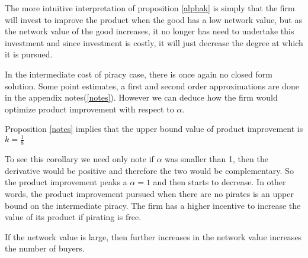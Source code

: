 The more intuitive interpretation of proposition \ref{alphak} is simply that the firm will invest to improve the product when the good has a low network value, but as the network value of the good increases, it no longer has need to undertake this investment and since investment is costly, it will just decrease the degree at which it is pursued.

In the intermediate cost of piracy case, there is once again no closed form solution. Some point estimates, a first and second order approximations are done in the appendix notes(\ref{notes}). However we can deduce how the firm would optimize product improvement with respect to $\alpha$. 

\begin{corollary}
Proposition \ref{notes} implies that the upper bound value of product improvement is $k= \frac{1}{8}$
\end{corollary}


To see this corollary we need only note if $\alpha$ was smaller than 1, then the derivative would be positive and therefore the two would be complementary. So the product improvement peaks a $\alpha=1$ and then starts to decrease. In other words, the product improvement pursued when there are no pirates is an upper bound on the intermediate piracy. The firm has a higher incentive to increase the value of its product if pirating is free. 

\begin{proposition}
If the network value is large, then further increases in the network value increases the number of buyers. 
\end{proposition}

